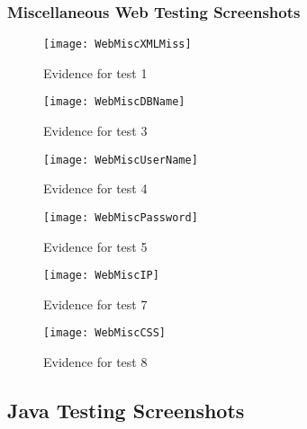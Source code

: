 \documentclass[
11pt, %
a4paper, %
oneside, %
headinclude,footinclude, %
BCOR5mm, %
]{scrartcl}
\begin{document}
\begin{appendices}
{{{{{{{{{{{{{{\subsubsection{Miscellaneous Web Testing Screenshots}
\begin{figure}[H]
	\centering
	\texttt{[image: WebMiscXMLMiss]}
	\caption[Evidence C.1.3 Test 1]{Evidence for test 1}
	\label{webmisctes1}	
\end{figure}
\begin{figure}[H]
	\centering
	\texttt{[image: WebMiscDBName]}
	\caption[Evidence C.1.3 Test 3]{Evidence for test 3}
	\label{webmisctes3}	
\end{figure}
\begin{figure}[H]
	\centering
	\texttt{[image: WebMiscUserName]}
	\caption[Evidence C.1.3 Test 4]{Evidence for test 4}
	\label{webmisctes4}	
\end{figure}
\begin{figure}[H]
	\centering
	\texttt{[image: WebMiscPassword]}
	\caption[Evidence C.1.3 Test 5]{Evidence for test 5}
	\label{webmisctes5}	
\end{figure}
\begin{figure}[H]
	\centering
	\texttt{[image: WebMiscIP]}
	\caption[Evidence C.1.3 Test 7]{Evidence for test 7}
	\label{webmisctes7}	
\end{figure}
\begin{figure}[H]
	\centering
	\texttt{[image: WebMiscCSS]}
	\caption[Evidence C.1.3 Test 8]{Evidence for test 8}
	\label{webmisctes8}	
\end{figure}
\subsection{Java Testing Screenshots}
}}}}}}}}}}}}}}
\end{appendices}
\end{document}
